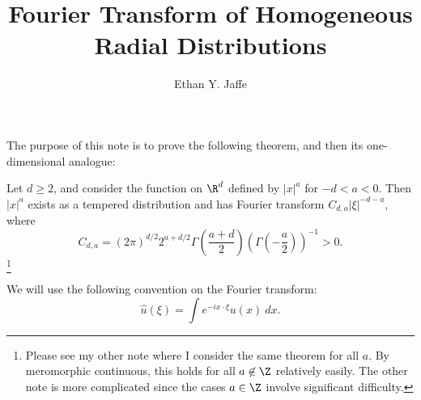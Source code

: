 \documentclass[12pt]{article}
\title{Fourier Transform of Homogeneous Radial Distributions}
\author{Ethan Y. Jaffe}
\date{}
\begin{document}
\maketitle
\setcounter{section}{1}
The purpose of this note is to prove the following theorem, and then its one-dimensional analogue:
\begin{thm}Let $d \geq 2$, and consider the function on $\R^d$ defined by $|x|^a$ for $-d < a < 0$. Then $|x|^a$ exists as a tempered distribution and has Fourier transform $C_{d,a}|\xi|^{-d-a}$, where 
\[C_{d,a} = (2\pi)^{d/2}2^{a+d/2}\Gamma\left(\frac{a+d}{2}\right)\left(\Gamma\left(-\frac{a}{2}\right)\right)^{-1} > 0.\]\footnote{Please see my other note where I consider the same theorem for all $a$. By meromorphic continuous, this holds for all $a \not \in \Z$ relatively easily. The other note is more complicated since the cases $a \in \Z$ involve significant difficulty.}\end{thm}
We will use the following convention on the Fourier transform:
\[\hat{u}(\xi) = \int e^{-ix\cdot \xi}u(x)\ dx.\]
\end{document}
